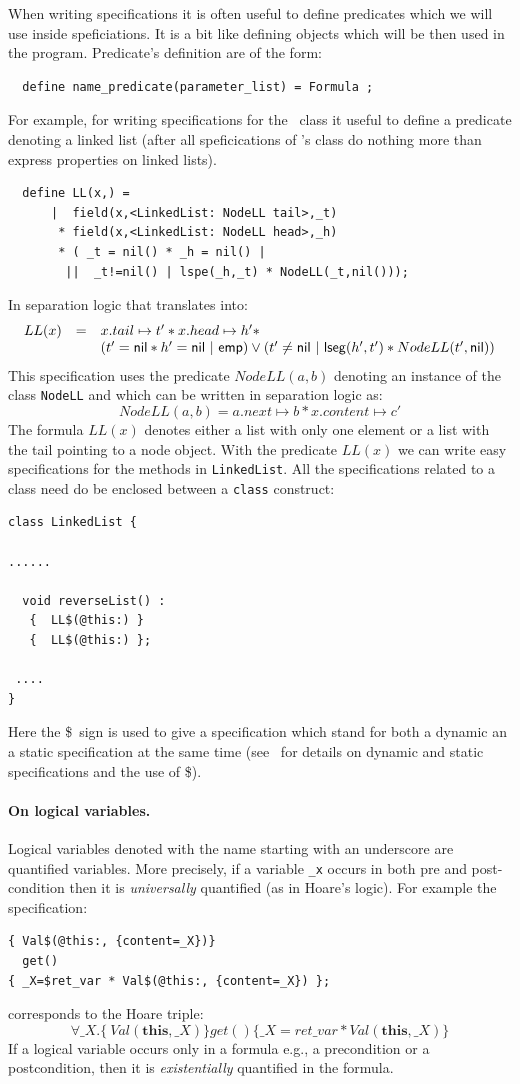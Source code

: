 \documentclass[11pt]{article}
\newcommand{\psto}{\mapsto}
\newcommand{\emp}{{\sf emp}}
\newcommand{\lseg}{{\sf lseg}}
\newcommand{\nil}{{\sf nil}}
\newcommand{\this}{\mathbf{this}}
\newcommand{\dollar}{\mbox{\$}}
\newcommand{\dinocomment}[1]{
\begin{center}
\fbox{
\begin{minipage}{3.0in}
{\bf Dino's comment:} {\it #1}
\end{minipage}
}
\end{center}
}
\begin{document}
When writing specifications it is often useful to define predicates
which we will use inside speficiations. It is a bit like defining
objects which will be then used in the program. Predicate's definition
are of the form:
\begin{verbatim}
  define name_predicate(parameter_list) = Formula ;
\end{verbatim}
For example, for writing specifications for the \linkedlist \ class it
useful to define a predicate denoting a linked list (after all
speficications of \linkedlist's class do nothing more than express
properties on linked lists).
\begin{verbatim}
  define LL(x,) =  
      |  field(x,<LinkedList: NodeLL tail>,_t) 
       * field(x,<LinkedList: NodeLL head>,_h) 
       * ( _t = nil() * _h = nil() | 
        ||  _t!=nil() | lspe(_h,_t) * NodeLL(_t,nil())); 
\end{verbatim}
\dinocomment{notation}
In separation logic that translates into:
\[\begin{array}{lll}
 LL(x) & = &  x.tail \psto t' * x.head \psto h' * 
\\
& & (t'=\nil * h'=\nil \ | \ \emp ) 
\vee 
(t' \neq \nil \ | \ \lseg(h',t') *NodeLL(t',\nil) )  
\end{array}
\]
This specification uses the predicate $NodeLL(a,b)$ denoting an instance of the class {\tt NodeLL}
and which can be written in separation logic as:
\[
  NodeLL(a,b) = a.next \psto b * x.content \psto c' 
\]
The formula
$LL(x)$ denotes either a list with only one element or a list with
the tail pointing to a node object. With the predicate $LL(x)$ we can
write easy specifications for the methods in {\tt LinkedList}.
All the specifications related to a class need do be enclosed between
a {\tt class} construct:
\begin{verbatim}
class LinkedList {

......

  void reverseList() : 
   {  LL$(@this:) } 
   {  LL$(@this:) };

 ....
}
\end{verbatim}
Here the \dollar \ sign is used to give a specification which stand for both a dynamic an a static specification at the same time (see~\cite{jstar} for details on dynamic and static specifications and the use of \dollar).
\paragraph{On logical variables.}
Logical variables denoted with the name starting with an underscore
are quantified variables. More precisely, if a variable {\tt \_x}
occurs in both pre and post-condition then it is {\em universally}
quantified (as in Hoare's logic). For example the specification:
\begin{verbatim}
{ Val$(@this:, {content=_X})} 
  get()
{ _X=$ret_var * Val$(@this:, {content=_X}) };
\end{verbatim}
corresponds to the Hoare triple:
\[
\forall \_X. \{ \ Val(\this,\_X) \} get() \{ \_X=ret\_var *  Val(\this, \_X)\}
\]
If a logical variable occurs only in a formula  e.g., a precondition or a postcondition, 
then it is {\em existentially} quantified in the formula.
\end{document}
